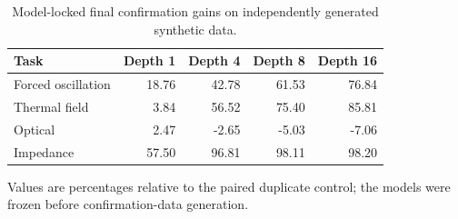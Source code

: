 \begin{table}[t]
\centering
\caption{Model-locked final confirmation gains on independently generated synthetic data.}
\label{tab:final-confirmation}
\small
\begin{tabular}{@{}lrrrr@{}}
\toprule
Task & Depth 1 & Depth 4 & Depth 8 & Depth 16 \\
\midrule
Forced oscillation & 18.76 & 42.78 & 61.53 & 76.84 \\
Thermal field & 3.84 & 56.52 & 75.40 & 85.81 \\
Optical & 2.47 & -2.65 & -5.03 & -7.06 \\
Impedance & 57.50 & 96.81 & 98.11 & 98.20 \\
\bottomrule
\end{tabular}
\par\vspace{2pt}\footnotesize Values are percentages relative to the paired duplicate control; the models were frozen before confirmation-data generation.
\end{table}
